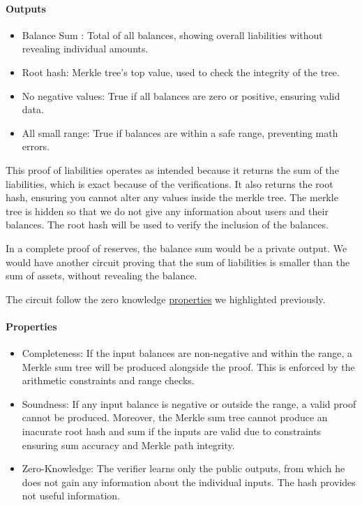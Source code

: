 \paragraph{Outputs}
\begin{itemize}
   \item Balance Sum : Total of all balances, showing overall liabilities without revealing individual amounts.
   \item Root hash: Merkle tree's top value, used to check the integrity of the tree.
   \item No negative values: True if all balances are zero or positive, ensuring valid data.
   \item All small range: True if balances are within a safe range, preventing math errors.
   \end{itemize}

This proof of liabilities operates as intended because it returns the sum of the liabilities, which is exact because of the verifications.
It also returns the root hash, ensuring you cannot alter any values inside the merkle tree. The merkle tree is hidden so that we do not
give any information about users and their balances.
The root hash will be used to verify the inclusion of the balances.

In a complete proof of reserves, the balance sum would be a private output. We would have another circuit proving that the sum of liabilities is smaller
than the sum of assets, without revealing the balance.

The circuit follow the zero knowledge \hyperref[subsec:zkp]{properties} we highlighted previously. 
\paragraph{Properties}
\begin{itemize}
   \item Completeness: If the input balances are non-negative and within the range, a Merkle sum tree will be produced alongside the proof. This is enforced by the arithmetic constraints and range checks.
   \item Soundness: If any input balance is negative or outside the range, a valid proof cannot be produced. Moreover, the Merkle sum tree cannot produce an inacurate root hash and sum if the inputs are valid due to constraints ensuring sum accuracy and Merkle path integrity.
   \item Zero-Knowledge: The verifier learns only the public outputs, from which he does not gain any information about the individual inputs. The hash provides not useful information.
   \end{itemize}


